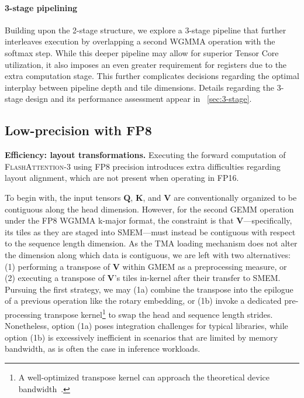 \begin{enumerate}
\paragraph{3-stage pipelining} Building upon the 2-stage structure, we explore a 3-stage pipeline that further interleaves execution by overlapping a second WGMMA operation with the softmax step. While this deeper pipeline may allow for superior Tensor Core utilization, it also imposes an even greater requirement for registers due to the extra computation stage. This further complicates decisions regarding the optimal interplay between pipeline depth and tile dimensions. Details regarding the 3-stage design and its performance assessment appear in ~\cref{sec:3-stage}.

\subsection{Low-precision with FP8}
\label{sec:algofp8}

\textbf{Efficiency: layout transformations.} Executing the forward computation of \textsc{FlashAttention-3} using FP8 precision introduces extra difficulties regarding layout alignment, which are not present when operating in FP16.

To begin with, the input tensors $\mathbf{Q}$, $\mathbf{K}$, and $\mathbf{V}$ are conventionally organized to be contiguous along the head dimension. However, for the second GEMM operation under the FP8 WGMMA k-major format, the constraint is that $\mathbf{V}$—specifically, its tiles as they are staged into SMEM—must instead be contiguous with respect to the sequence length dimension. As the TMA loading mechanism does not alter the dimension along which data is contiguous, we are left with two alternatives: (1) performing a transpose of $\mathbf{V}$ within GMEM as a preprocessing measure, or (2) executing a transpose of $\mathbf{V}$'s tiles in-kernel after their transfer to SMEM. Pursuing the first strategy, we may (1a) combine the transpose into the epilogue of a previous operation like the rotary embedding, or (1b) invoke a dedicated pre-processing transpose kernel\footnote{A well-optimized transpose kernel can approach the theoretical device bandwidth~\citep{colfax_cutlass_transpose_2024}.} to swap the head and sequence length strides. Nonetheless, option (1a) poses integration challenges for typical libraries, while option (1b) is excessively inefficient in scenarios that are limited by memory bandwidth, as is often the case in inference workloads.


\end{enumerate}
